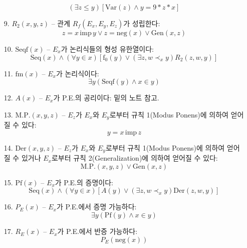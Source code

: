 \documentclass[12pt]{paper}
\begin{document}
\begin{enumerate}
$$ \left( \exists z \le y \right) \left[ \mathrm{Var} \left( z \right) \land y = 9 * z * x \right] $$
\item[{9.}] $R_2 \left( x , y , z \right)$ -- 관계 $R_f \left( E_x , E_y , E_z \right)$가 성립한다:
$$ z = x \, \mathrm{imp} \, y \lor z = \mathrm{neg} \left( x \right) \lor \mathrm{Gen} \left( x , z \right) $$
\item[{10.}] $\mathrm{Seqf} \left( x \right)$ -- $E_x$가 논리식들의 형성 유한열이다:
$$ \mathrm{Seq} \left( x \right) \land \left( \forall y \in x \right) \left[ \mathrm{f}_0 \left( y \right) \lor \left( \exists z , w \prec_x y \right) R_2 \left( z , w , y \right) \right]$$
\item[{11.}] $\mathrm{fm} \left( x \right)$ -- $E_x$가 논리식이다:
$$ \exists y \left( \mathrm{Seqf} \left( y \right) \land x \in y \right) $$
\item[{12.}] $A \left( x \right)$ -- $E_x$가 P.E.의 공리이다: 밑의 노트 참고.
\item[{13.}] $\mathrm{M.P.} \left( x , y , z \right)$ -- $E_z$가 $E_x$와 $E_y$로부터 규칙 1(Modus Ponens)에 의하여 얻어질 수 있다:
$$ y = x \, \mathrm{imp} \, z $$
\item[{14.}] $\mathrm{Der} \left( x , y , z \right)$ -- $E_z$가 $E_x$와 $E_y$로부터 규칙 1(Modus Ponens)에 의하여 얻어질 수 있거나 $E_x$로부터 규칙 2(Generalization)에 의하여 얻어질 수 있다:
$$\mathrm{M.P.} \left( x , y , z \right) \lor \mathrm{Gen} \left( x , z \right)$$
\item[{15.}] $\mathrm{Pf} \left( x \right)$ -- $E_x$가 P.E.의 증명이다:
$$ \mathrm{Seq} \left( x \right) \land \left( \forall y \in x \right) \left[ A \left( y \right) \lor \left( \exists z , w \prec_x y \right) \mathrm{Der} \left( z , w , y \right) \right] $$
\item[{16.}] $P_E \left( x \right)$ -- $E_x$가 P.E.에서 증명 가능하다:
$$ \exists y \left( \mathrm{Pf} \left( y \right) \land x \in y \right) $$
\item[{17.}] $R_E \left( x \right)$ -- $E_x$가 P.E.에서 반증 가능하다:
$$ P_E \left( \mathrm {neg} \left( x \right) \right) $$
\end{enumerate}
\end{document}
